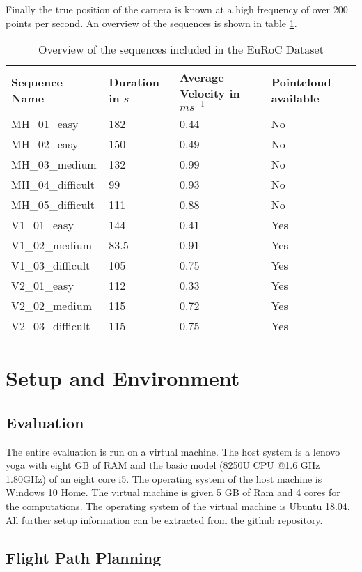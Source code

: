
	Finally the true position of the 
	camera is known at a high frequency of over 200 points per second. 
	An overview of the sequences is shown in table \ref{table:euroctable}.



	\begin{table}
	\caption{Overview of the sequences included in the EuRoC Dataset}
	\begin{tabular}{ |p{3cm}||p{3cm}|p{3cm}|p{3cm}|}
	\hline
	Sequence Name& Duration in $s$ & Average Velocity in $ms^{-1}$ &Pointcloud available\\
	\hline
	MH\_01\_easy & 182 & 0.44 & No\\
	MH\_02\_easy & 150 & 0.49 & No\\
	MH\_03\_medium & 132 & 0.99 & No\\
	MH\_04\_difficult & 99 & 0.93 & No\\
	MH\_05\_difficult & 111 & 0.88 & No\\
	V1\_01\_easy & 144 & 0.41 & Yes\\
	V1\_02\_medium & 83.5 & 0.91 & Yes\\
	V1\_03\_difficult & 105 & 0.75 & Yes\\
	V2\_01\_easy & 112 & 0.33 & Yes\\
	V2\_02\_medium & 115 & 0.72 & Yes\\
	V2\_03\_difficult & 115 & 0.75 & Yes\\
	\hline
	\end{tabular}
	\label{table:euroctable}
	\end{table}
	
\section{Setup and Environment}

	\subsection{Evaluation}
	
	The entire evaluation is run on a virtual machine. The host system is a lenovo yoga with eight GB of RAM and the basic model (8250U CPU @1.6 
	GHz 1.80GHz) of an eight core i5. The operating system of the host machine is Windows 10 Home. The virtual
	machine is given 5 GB of Ram and 4 cores for the computations. The operating system of the virtual machine is Ubuntu 18.04. All further setup information can be extracted 
	from the github repository.

	\subsection{Flight Path Planning}